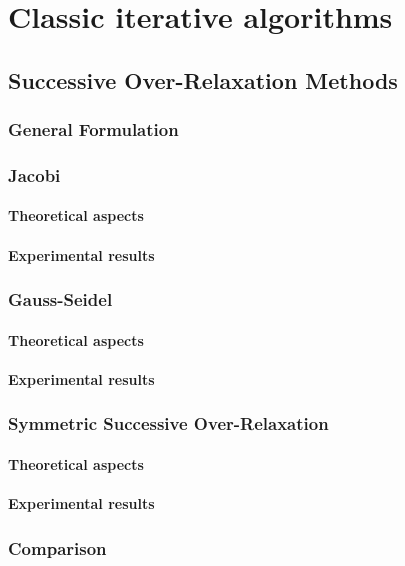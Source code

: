 \chapter{Classic iterative algorithms}


\section{Successive Over-Relaxation Methods}

	\subsection{General Formulation}
		\subsection{Jacobi}
			\subsubsection{Theoretical aspects}
			\subsubsection{Experimental results}
		\subsection{Gauss-Seidel}
			\subsubsection{Theoretical aspects}
			\subsubsection{Experimental results}
		\subsection{Symmetric Successive Over-Relaxation}
			\subsubsection{Theoretical aspects}
			\subsubsection{Experimental results}
		\subsection{Comparison}

